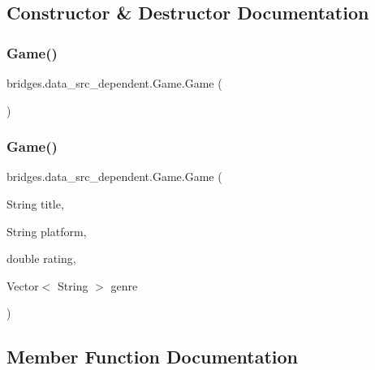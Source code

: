\subsection{Constructor \& Destructor Documentation}
\hypertarget{classbridges_1_1data__src__dependent_1_1_game_a9f145dbcbbfbb0432a2cd8631e57173b}{}\label{classbridges_1_1data__src__dependent_1_1_game_a9f145dbcbbfbb0432a2cd8631e57173b} 
\subsubsection{\texorpdfstring{Game()}{Game()}\hspace{0.1cm}{\footnotesize\ttfamily [1/2]}}
{\footnotesize\ttfamily bridges.\+data\+\_\+src\+\_\+dependent.\+Game.\+Game (\begin{DoxyParamCaption}{ }\end{DoxyParamCaption})}

\hypertarget{classbridges_1_1data__src__dependent_1_1_game_a2bb9d9f659184be2cc9fc68e38433492}{}\label{classbridges_1_1data__src__dependent_1_1_game_a2bb9d9f659184be2cc9fc68e38433492} 
\subsubsection{\texorpdfstring{Game()}{Game()}\hspace{0.1cm}{\footnotesize\ttfamily [2/2]}}
{\footnotesize\ttfamily bridges.\+data\+\_\+src\+\_\+dependent.\+Game.\+Game (\begin{DoxyParamCaption}\item[{String}]{title,  }\item[{String}]{platform,  }\item[{double}]{rating,  }\item[{Vector$<$ String $>$}]{genre }\end{DoxyParamCaption})}



\subsection{Member Function Documentation}
\hypertarget{classbridges_1_1data__src__dependent_1_1_game_ab3c0e46513e71b56a2970ac014b1bf79}{}\label{classbridges_1_1data__src__dependent_1_1_game_ab3c0e46513e71b56a2970ac014b1bf79} 

